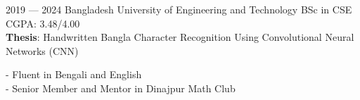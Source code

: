 \documentclass[9pt]{developercv}
\begin{document}

\begin{entrylist}
    \entry
		{2019 --- 2024}
		{Bangladesh University of Engineering and Technology}
		{BSc in CSE}
		{CGPA: 3.48/4.00 \\
        \textbf{Thesis}: Handwritten Bangla Character Recognition Using Convolutional Neural Networks (CNN)}
\end{entrylist}

    \qquad  - Fluent in Bengali and English \\
    \qquad  - Senior Member and Mentor in Dinajpur Math Club 
\end{document}
